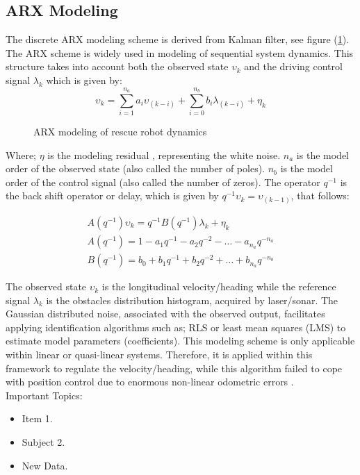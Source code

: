 \subsection{ARX Modeling}
The discrete ARX modeling scheme  is derived from Kalman filter, see figure (\ref{fig:ARX}). The ARX scheme is widely used in modeling of sequential  system dynamics. This structure takes into account both the observed state $\upsilon_{k}$ and
the driving control signal $\lambda_{k}$ which is given by:
\begin{equation}
\upsilon_k = \sum\limits_{i = 1}^{n_a } {a_i \upsilon_{(k - i)} + } \sum\limits_{i =
0}^{n_b } {b_i \lambda_{(k - i)} + } \eta_k
\label{eq:ARX1}
\end{equation}

\begin{figure}[ht!]
\centering
{}
\caption{ARX modeling of rescue robot dynamics}
\label{fig:ARX}
\end{figure}

Where; $\eta$ is  the modeling residual , representing the white noise. $n_a$ is the model order of the observed state (also called the number of poles). $n_b$ is the model order of the control signal (also called the number of zeros). The operator $q^{-1}$  is the back shift operator or delay, which is given by $q^{ - 1}\upsilon_k = \upsilon_{(k - 1)} $,  that follows: 

\begin{equation}
\begin{array}{l}
A(q^{ - 1})\upsilon_k = q^{ - 1}B(q^{ - 1})\lambda_k + \eta_k \\
A(q^{ - 1}) = 1 - a_1 q^{ - 1} - a_2 q^{ - 2} - \ldots - a_{n_a } q^{ - n_a
} \\
B(q^{ - 1}) = b_0 + b_1 q^{ - 1} + b_2 q^{ - 2} + \ldots + b_{n_a } q^{ -
n_b } 
 \end{array}
 \label{eq:ARX2}
\end{equation}

The observed state $\upsilon_{k}$ is the longitudinal velocity/heading while the reference signal $\lambda_{k}$ is the obstacles distribution histogram, acquired by laser/sonar. The Gaussian distributed noise, associated with the observed output, facilitates applying identification algorithms such as; RLS or least mean squares (LMS) to estimate model parameters (coefficients).  This modeling scheme is only applicable within linear or quasi-linear systems. Therefore, it is applied  within this framework to regulate the velocity/heading, while this algorithm failed to cope with position control due to enormous non-linear odometric errors \cite{Buauthor_98, Jauthor_001, Sauthor_011, Rauthor_901, Sauthor_021, Abauthor_2003_13, Boauthor_971, kauthor_2002}. \\

Important Topics:
\begin{itemize}
	\item Item 1.
	\item Subject 2.
	\item New Data.
\end{itemize}
